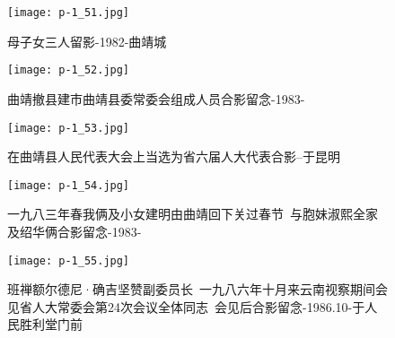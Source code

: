 \clearpage


\begin{figure}
    \begin{center}
        \texttt{[image: p-1\_51.jpg]}
        \begin{shaded}
            \caption{母子女三人留影-1982-曲靖城}
        \end{shaded}
    \end{center}
\end{figure}

\clearpage


\begin{figure}
    \begin{center}
        \texttt{[image: p-1\_52.jpg]}
        \begin{shaded}
            \caption{曲靖撤县建市曲靖县委常委会组成人员合影留念-1983-}
        \end{shaded}
    \end{center}
\end{figure}

\clearpage


\begin{figure}
    \begin{center}
        \texttt{[image: p-1\_53.jpg]}
        \begin{shaded}
            \caption{在曲靖县人民代表大会上当选为省六届人大代表合影--于昆明}
        \end{shaded}
    \end{center}
\end{figure}

\clearpage


\begin{figure}
    \begin{center}
        \texttt{[image: p-1\_54.jpg]}
        \begin{shaded}
            \caption{一九八三年春我俩及小女建明由曲靖回下关过春节~与胞妹淑熙全家及绍华俩合影留念-1983-}
        \end{shaded}
    \end{center}
\end{figure}

\clearpage


\begin{figure}
    \begin{center}
        \texttt{[image: p-1\_55.jpg]}
        \begin{shaded}
            \caption{班禅额尔德尼·确吉坚赞副委员长~一九八六年十月来云南视察期间会见省人大常委会第24次会议全体同志~会见后合影留念-1986.10-于人民胜利堂门前}
        \end{shaded}
    \end{center}
\end{figure}

